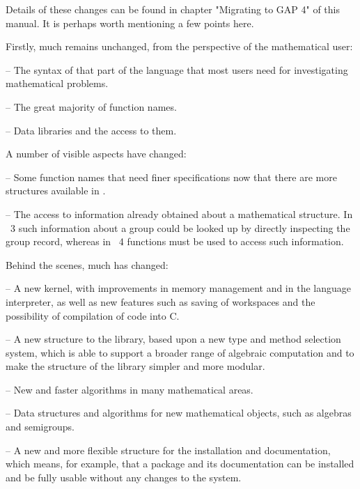 Details of these changes can be found in chapter "Migrating to GAP 4" of
this manual. It is perhaps worth mentioning a few points here. 

Firstly, much remains unchanged, from the perspective of the mathematical 
user:

\beginlist%
  \item{--}
    The syntax of that part  of the {\GAP} language  that most users need
    for investigating mathematical problems.

  \item{--}
    The great majority of function names.

  \item{--}
    Data libraries and the access to them.
\endlist

A number of visible aspects have changed:

\beginlist%
  \item{--}
    Some function names that need finer specifications now that there are
    more structures available in {\GAP}.

  \item{--}  
    The    access to information   already  obtained about a mathematical
    structure. In {\GAP}~3 such information about a group could be looked
    up  by  directly inspecting  the  group record,  whereas in  {\GAP}~4
    functions must be used to access such information.
\endlist

Behind the scenes, much has changed: 

\beginlist%
  \item{--} A new kernel,  with improvements in  memory management  and in
  the language interpreter, as well  as new  features  such as saving  of
  workspaces and the possibility of compilation of {\GAP} code into C.

  \item{--} A new structure   to the library, based  upon  a new  type and
  method  selection system, which  is able to  support a broader range of
  algebraic computation and to make the  structure of the library simpler
  and more modular.

  \item{--}
    New and faster algorithms in many mathematical areas.

  \item{--} 
    Data structures and algorithms for new mathematical objects, such as
    algebras and semigroups.

  \item{--}
    A new and more flexible structure  for the {\GAP} installation
    and documentation, which  means, for example, that a {\GAP} package and
    its documentation can be installed and be fully usable without any changes
    to the {\GAP} system.
\endlist

